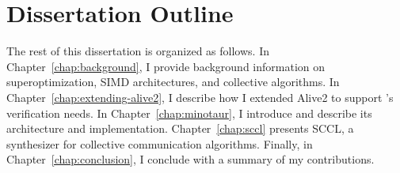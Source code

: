 \section{Dissertation Outline}

The rest of this dissertation is organized as follows.
%
In Chapter~\ref{chap:background}, I
provide background information on superoptimization, SIMD architectures,
and collective algorithms.
%
In Chapter~\ref{chap:extending-alive2}, I describe how I extended
Alive2 to support \minotaur{}'s verification needs.
%
In Chapter~\ref{chap:minotaur}, I introduce \minotaur{} and
describe its architecture and implementation.
%
Chapter~\ref{chap:sccl} presents SCCL,
a synthesizer for collective communication algorithms.
Finally, in Chapter~\ref{chap:conclusion}, I conclude with a summary of my contributions.